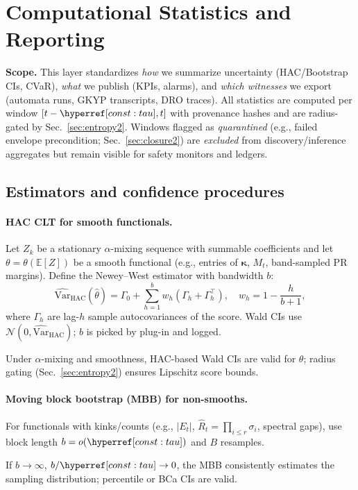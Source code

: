 \section{Computational Statistics and Reporting}\label{sec:stats2}

\noindent\textbf{Scope.}
This layer standardizes \emph{how} we summarize uncertainty (HAC/Bootstrap CIs, CVaR), \emph{what} we publish (KPIs, alarms), and \emph{which witnesses} we export (automata runs, GKYP transcripts, DRO traces). All statistics are computed per window $[t-\constref{tau},t]$ with provenance hashes and are radius-gated by Sec.~\ref{sec:entropy2}. Windows flagged as \emph{quarantined} (e.g., failed envelope precondition; Sec.~\ref{sec:closure2}) are \emph{excluded} from discovery/inference aggregates but remain visible for safety monitors and ledgers.

\subsection*{Estimators and confidence procedures}

\paragraph{HAC CLT for smooth functionals.}
Let $Z_k$ be a stationary $\alpha$-mixing sequence with summable coefficients and let $\theta=\theta(\mathbb E[Z])$ be a smooth functional (e.g., entries of $\bm\kappa$, $M_t$, band-sampled PR margins).
Define the Newey–West estimator with bandwidth $b$:
\[
\widehat{\mathrm{Var}}_{\mathrm{HAC}}(\hat\theta)
=\Gamma_0+\sum_{h=1}^{b}w_h(\Gamma_h+\Gamma_h^\top),
\quad
w_h=1-\frac{h}{b+1},
\]
where $\Gamma_h$ are lag-$h$ sample autocovariances of the score.
Wald CIs use $\mathcal N(0,\widehat{\mathrm{Var}}_{\mathrm{HAC}})$; $b$ is picked by plug-in and logged.

\begin{lemma}\label{lem:hac2}
\emph{}
Under $\alpha$-mixing and smoothness, HAC-based Wald CIs are valid for $\theta$; radius gating (Sec.~\ref{sec:entropy2}) ensures Lipschitz score bounds.
\end{lemma}

\paragraph{Moving block bootstrap (MBB) for non-smooths.}
For functionals with kinks/counts (e.g., $|E_t|$, $\widehat R_t=\prod_{i\le r}\sigma_i$, spectral gaps),
use block length $b=o(\constref{tau})$ and $B$ resamples.
\begin{proposition}\label{prop:bb2}
\emph{}
If $b\to\infty$, $b/\constref{tau}\to 0$, the MBB consistently estimates the sampling distribution; percentile or BCa CIs are valid.
\end{proposition}

